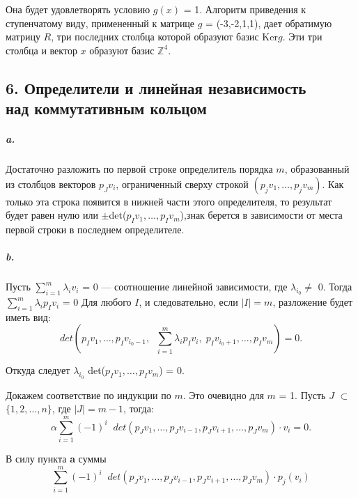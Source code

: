 {\noindent Она будет удовлетворять условию $g(x)$ = 1. Алгоритм приведения к ступенчатому виду, примененный к матрице $g$ = (-3,-2,1,1), дает обратимую матрицу $R$, три последних столбца которой образуют базис Ker{$g$}. Эти три столбца и вектор $x$ образуют базис $\mathbb {Z}^{4}$.

\newpage


\subsection{\normalsize{6. Определители и линейная независимость\\
над коммутативным кольцом}}

\subparagraph{a.} Достаточно разложить по первой строке определитель порядка $m$, образованный из столбцов векторов $p_{J}v_{i}$, ограниченный сверху строкой $(p_{j}v_{1},\ldots,p_{j}v_{m})$. Как только эта строка появится в нижней части этого определителя, то результат будет равен нулю или
$\pm$det($p_{I}v_{1},\ldots,p_{I}v_{m}$),знак берется в зависимости от места первой строки в последнем определителе.

\subparagraph{b.} Пусть $\sum_{i=1}^{m} \lambda_{i}v_{i}$ = 0 --- соотношение линейной зависимости, где
$\lambda_{i_0} \neq$ 0. Тогда $\sum_{i=1}^{m} \lambda_{i}p_{I}v_{i}$ = 0 Для любого $I$, и следовательно, если
$|I| = m$, разложение будет иметь вид:
\begin{equation*}
det(p_{I}v_1,\ldots,p_{I}v_{i_{0}-1},\;\;\sum_{i=1}^m \lambda_{i}p_{I}v_{i},\;p_{I}v_{i_{0}+1},\ldots,p_{I}v_{m}) = 0.
\end{equation*}

\noindent Откуда следует $\lambda_{i_0}$ det($p_{I}v_{1},\ldots,p_{I}v_{m}$) = 0.

Докажем соответствие по индукции по $m$. Это очевидно для $m$ = 1.
Пусть $J$ $\subset$ $\{1,2,\ldots,n\}$, где $|J| = m - 1$, тогда:
\setcounter{equation}{5}
\begin{equation}
\alpha \sum_{i=1}^m (-1)^{i}\;\;det(p_{J}v_{1},\ldots,p_{J}v_{i-1},p_{J}v_{i+1},\ldots,p_{J}v_{m}) \cdot v_{i} = 0.
\end{equation}

\noindent В силу пункта {\bf a} суммы
\begin{equation*}
\sum_{i=1}^m (-1)^i\;\;det(p_{J}v_1,\ldots,p_{J}v_{i-1},p_{J}v_{i+1},\ldots,p_{J}v_{m}) \cdot p_{j}(v_{i})
\end{equation*}

}

